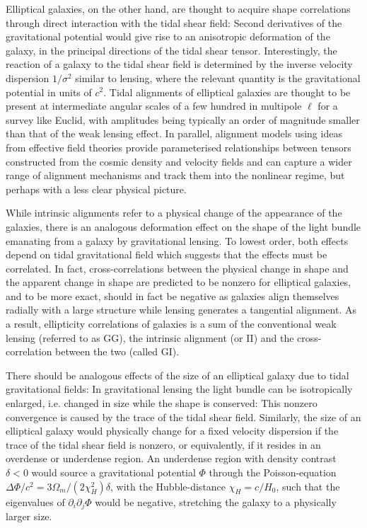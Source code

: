 \documentclass[a4paper,fleqn,usenatbib]{mnras}
\begin{document}
Elliptical galaxies, on the other hand, are thought to acquire shape correlations through direct interaction with the tidal shear field: Second derivatives of the gravitational potential would give rise to an anisotropic deformation of the galaxy, in the principal directions of the tidal shear tensor. Interestingly, the reaction of a galaxy to the tidal shear field is determined by the inverse velocity dispersion $1/\sigma^2$ similar to lensing, where the relevant quantity is the gravitational potential in units of $c^2$. Tidal alignments of elliptical galaxies are thought to be present at intermediate angular scales of a few hundred in multipole $\ell$ for a survey like Euclid, with amplitudes being typically an order of magnitude smaller than that of the weak lensing effect. In parallel, alignment models using ideas from effective field theories provide parameterised relationships between tensors constructed from the cosmic density and velocity fields and can capture a wider range of alignment mechanisms and track them into the nonlinear regime, but perhaps with a less clear physical picture. 

While intrinsic alignments refer to a physical change of the appearance of the galaxies, there is an analogous deformation effect on the shape of the light bundle emanating from a galaxy by gravitational lensing. To lowest order, both effects depend on tidal gravitational field which suggests that the effects must be correlated. In fact, cross-correlations between the physical change in shape and the apparent change in shape are predicted to be nonzero for elliptical galaxies, and to be more exact, should in fact be negative as galaxies align themselves radially with a large structure while lensing generates a tangential alignment. As a result, ellipticity correlations of galaxies is a sum of the conventional weak lensing (referred to as GG), the intrinsic alignment (or II) and the cross-correlation between the two (called GI).

There should be analogous effects of the size of an elliptical galaxy due to tidal gravitational fields: In gravitational lensing the light bundle can be isotropically enlarged, i.e. changed in size while the shape is conserved: This nonzero convergence is caused by the trace of the tidal shear field. Similarly, the size of an elliptical galaxy would physically change for a fixed velocity dispersion if the trace of the tidal shear field is nonzero, or equivalently, if it resides in an overdense or underdense region. An underdense region with density contrast $\delta < 0$ would source a gravitational potential $\Phi$ through the Poisson-equation $\Delta\Phi/c^2 = 3\Omega_m/(2\chi_H^2)\delta$, with the Hubble-distance $\chi_H = c/H_0$, such that the eigenvalues of $\partial_i\partial_j\Phi$ would be negative, stretching the galaxy to a physically larger size.
\end{document}
